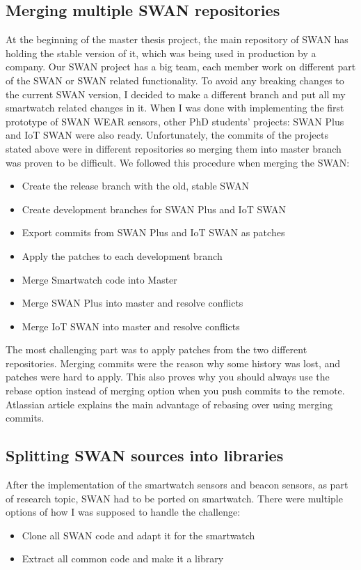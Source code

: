 \subsection{Merging multiple SWAN repositories}
At the beginning of the master thesis project, the main repository of SWAN has holding the stable version of it, which was being used in production 
by a  company. Our SWAN project has a big team, each member work on different part of the SWAN or SWAN related functionality.
To avoid any breaking changes to the current SWAN version, I decided to make a different branch and put all my smartwatch related changes in it.
When I was done with implementing the first prototype of SWAN WEAR sensors, other PhD students' projects: SWAN Plus and IoT SWAN were also ready.
Unfortunately, the commits of the projects stated above were in different repositories so merging them into master branch was proven to be difficult.
We followed this procedure when merging the SWAN:
\begin{itemize}
 \item Create the release branch with the old, stable SWAN
 \item Create development branches for SWAN Plus and IoT SWAN
 \item Export commits from SWAN Plus and IoT SWAN as patches
 \item Apply the patches to each development branch
 \item Merge Smartwatch code into Master
 \item Merge SWAN Plus into master and resolve conflicts
 \item Merge IoT SWAN into master and resolve conflicts
\end{itemize}

The most challenging part was to apply patches from the two different repositories. Merging commits were the reason why some history was 
lost, and patches were hard to apply. This also proves why you should always use the rebase option instead of merging option when you push commits
to the remote. Atlassian article\cite{atlassian_merge_rebase} explains the main advantage of rebasing over using merging commits.

\subsection{Splitting SWAN sources into libraries}\label{scc:swan_split}
After the implementation of the smartwatch sensors and beacon sensors, as part of research topic, SWAN had to be ported on smartwatch.
There were multiple options of how I was supposed to handle the challenge:
\begin{itemize}
 \item Clone all SWAN code and adapt it for the smartwatch
 \item Extract all common code and make it a library
\end{itemize}

